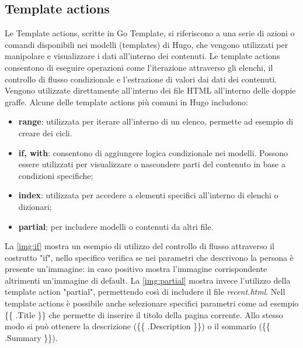 \documentclass[target=bach,aauheader=]{thud}
\begin{document}
\subsection{Template actions}\label{sec:tactions}
Le Template actions, scritte in Go Template, si riferiscono a una serie di azioni o comandi disponibili nei modelli (templates) di Hugo, che vengono utilizzati per manipolare e visualizzare i dati all'interno dei contenuti. 
Le template actions consentono di eseguire operazioni come l'iterazione attraverso gli elenchi, il controllo di flusso condizionale e l'estrazione di valori dai dati dei contenuti. Vengono utilizzate direttamente all'interno dei file HTML all'interno delle doppie graffe. \newline
Alcune delle template actions più comuni in Hugo includono:
\begin{itemize}
    \item \textbf{range}: utilizzata per iterare all'interno di un elenco, permette ad esempio di creare dei cicli.
    \item \textbf{if, with}: consentono di aggiungere logica condizionale nei modelli. Possono essere utilizzati per visualizzare o nascondere parti del contenuto in base a condizioni specifiche;
    \item \textbf{index}: utilizzata per accedere a elementi specifici all'interno di elenchi o dizionari;
    \item \textbf{partial}: per includere modelli o contenuti da altri file. 
\end{itemize}

La \cref{img:if} mostra un esempio di utilizzo del controllo di flusso attraverso il costrutto "if", nello specifico verifica se nei parametri che descrivono la persona è presente un'immagine: in caso positivo mostra l'immagine corrispondente altrimenti un'immagine di default.
La \cref{img:partial} mostra invece l'utilizzo della template action "partial", permettendo così di includere il file \textit{recent.html}. \newline 
Nell template actions è possibile anche selezionare specifici parametri come ad esempio \{\{ .Title \}\} che permette di inserire il titolo della pagina corrente. Allo stesso modo si può ottenere la descrizione (\{\{ .Description \}\}) o il sommario (\{\{ .Summary \}\}).
\end{document}
